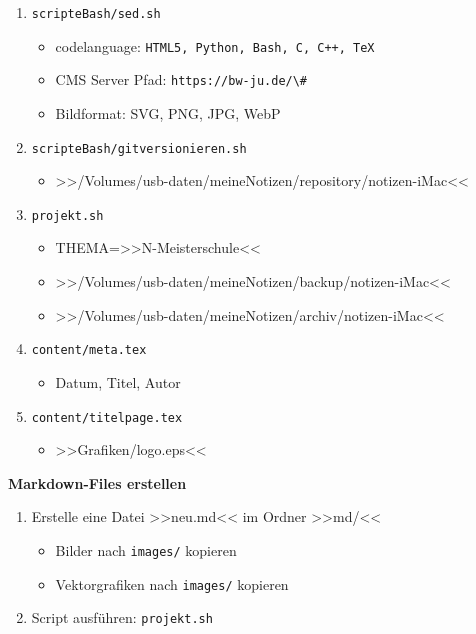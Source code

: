 \begin{enumerate}
\item
  \verb|scripteBash/sed.sh|

  \begin{itemize}
  \item
    codelanguage:
    \verb|HTML5, Python, Bash, C, C++, TeX|
  \item
    CMS Server Pfad: \verb|https://bw-ju.de/\#|
  \item
    Bildformat: SVG, PNG, JPG, WebP
  \end{itemize}
\item
  \verb|scripteBash/gitversionieren.sh|

  \begin{itemize}
  \item
    >>/Volumes/usb-daten/meineNotizen/repository/notizen-iMac<<
  \end{itemize}
\item
  \verb|projekt.sh|

  \begin{itemize}
  \item
    THEMA=>>N-Meisterschule<<
  \item
    >>/Volumes/usb-daten/meineNotizen/backup/notizen-iMac<<
  \item
    >>/Volumes/usb-daten/meineNotizen/archiv/notizen-iMac<<
  \end{itemize}
\item
  \verb|content/meta.tex|

  \begin{itemize}
  \item
    Datum, Titel, Autor
  \end{itemize}
\item
  \verb|content/titelpage.tex|

  \begin{itemize}
  \item
    >>Grafiken/logo.eps<<
  \end{itemize}
\end{enumerate}

\textbf{Markdown-Files erstellen}

\begin{enumerate}
\item
  Erstelle eine Datei >>neu.md<< im Ordner >>md/<<

  \begin{itemize}
  \item
    Bilder nach \verb|images/| kopieren
  \item
    Vektorgrafiken nach \verb|images/| kopieren
  \end{itemize}
\item
  Script ausführen: \verb|projekt.sh|
\end{enumerate}

